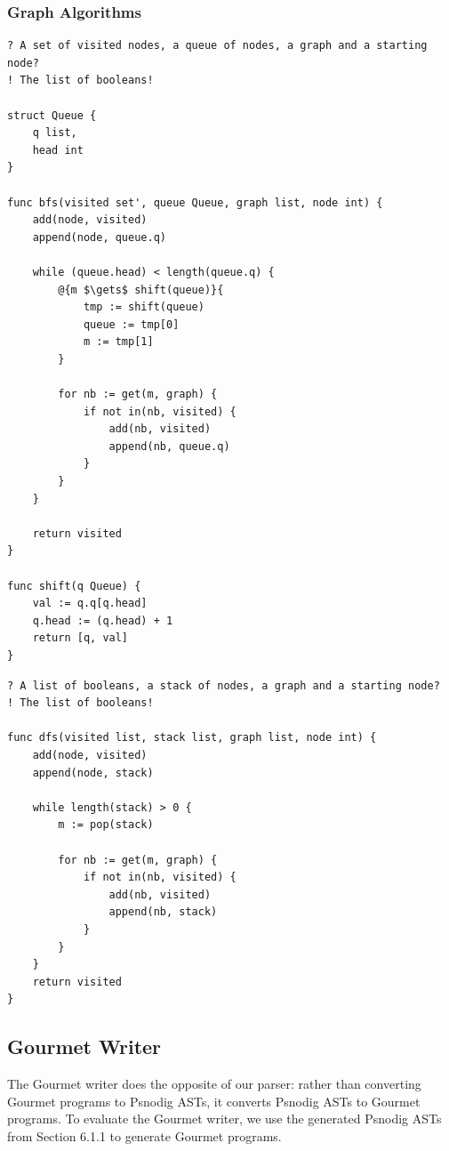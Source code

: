 \subsubsection{Graph Algorithms}

\begin{lstlisting}[caption={BFS implementation in Gourmet.}, captionpos=b, label={bfsGourmet}]
? A set of visited nodes, a queue of nodes, a graph and a starting node?
! The list of booleans!

struct Queue {
    q list,
    head int
}

func bfs(visited set', queue Queue, graph list, node int) {
    add(node, visited)
    append(node, queue.q)

    while (queue.head) < length(queue.q) {
        @{m $\gets$ shift(queue)}{
            tmp := shift(queue)
            queue := tmp[0]
            m := tmp[1]
        }

        for nb := get(m, graph) {
            if not in(nb, visited) {
                add(nb, visited)
                append(nb, queue.q)
            }
        }
    }

    return visited
}

func shift(q Queue) {
    val := q.q[q.head]
    q.head := (q.head) + 1
    return [q, val]
}
\end{lstlisting}

\begin{lstlisting}[caption={DFS implementation in Gourmet.}, captionpos=b, label={dfsGourmet}]
? A list of booleans, a stack of nodes, a graph and a starting node?
! The list of booleans!

func dfs(visited list, stack list, graph list, node int) {
    add(node, visited)
    append(node, stack)

    while length(stack) > 0 {
        m := pop(stack)

        for nb := get(m, graph) {
            if not in(nb, visited) {
                add(nb, visited)
                append(nb, stack)
            }
        }
    }
    return visited
}
\end{lstlisting}

\subsection{Gourmet Writer}

The Gourmet writer does the opposite of our parser: rather than converting Gourmet programs to Psnodig ASTs, it converts Psnodig ASTs to Gourmet programs. To evaluate the Gourmet writer, we use the generated Psnodig ASTs from Section 6.1.1 to generate Gourmet programs. \\

